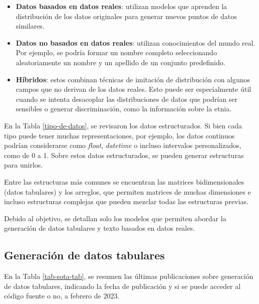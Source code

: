 \begin{itemize}
    \item \textbf{Datos basados en datos reales}: utilizan modelos que aprenden la distribución de los datos originales para generar nuevos puntos de datos similares.
    \item \textbf{Datos no basados en datos reales}: utilizan conocimientos del mundo real. Por ejemplo, se podría formar un nombre completo seleccionando aleatoriamente un nombre y un apellido de un conjunto predefinido.
    \item \textbf{Híbridos}: estos combinan técnicas de imitación de distribución con algunos campos que no derivan de los datos reales. Esto puede ser especialmente útil cuando se intenta desacoplar las distribuciones de datos que podrían ser sensibles o generar discriminación, como la información sobre la etnia.
\end{itemize}
    
En la Tabla \ref{tipo-de-datos}, se revisaron los datos estructurados. Si bien cada tipo puede tener muchas representaciones, por ejemplo, los datos continuos podrían considerarse como \emph{float}, \emph{datetime} o incluso intervalos personalizados, como de 0 a 1. Sobre estos datos estructurados, se pueden generar estructuras para unirlos.

Entre las estructuras más comunes se encuentran las matrices bidimensionales (datos tabulares) y los arreglos, que permiten matrices de muchas dimensiones e incluso estructuras complejas que pueden mezclar todas las estructuras previas.

Debido al objetivo, se detallan solo los modelos que permiten abordar la generación de datos tabulares y texto basados en datos reales.
\subsection{Generación de datos tabulares}
\label{gen-data-tab}
En la Tabla \ref{tab-sota-tab}, se resumen las últimas publicaciones sobre generación de datos tabulares, indicando la fecha de publicación y si se puede acceder al código fuente o no, a febrero de 2023.

